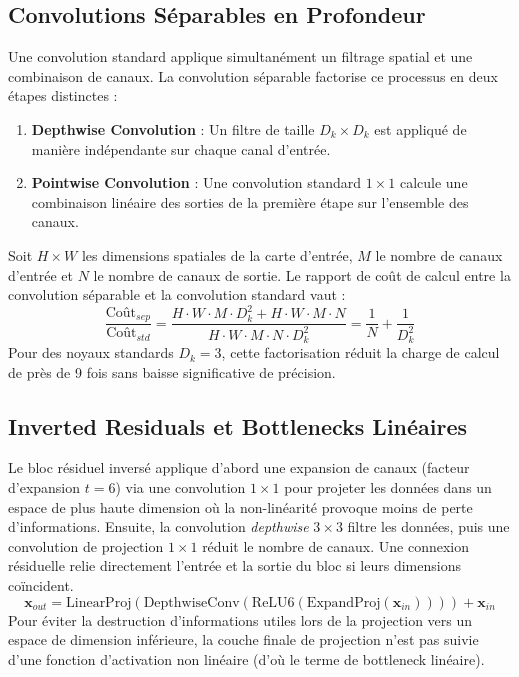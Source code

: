 \documentclass[12pt,a4paper]{article}
\begin{document}
\subsection{Convolutions Séparables en Profondeur}
Une convolution standard applique simultanément un filtrage spatial et une combinaison de canaux. La convolution séparable factorise ce processus en deux étapes distinctes :
\begin{enumerate}
    \item \textbf{Depthwise Convolution} : Un filtre de taille $D_k \times D_k$ est appliqué de manière indépendante sur chaque canal d'entrée.
    \item \textbf{Pointwise Convolution} : Une convolution standard $1 \times 1$ calcule une combinaison linéaire des sorties de la première étape sur l'ensemble des canaux.
\end{enumerate}
Soit $H \times W$ les dimensions spatiales de la carte d'entrée, $M$ le nombre de canaux d'entrée et $N$ le nombre de canaux de sortie. Le rapport de coût de calcul entre la convolution séparable et la convolution standard vaut :
\begin{equation}
    \frac{\text{Coût}_{sep}}{\text{Coût}_{std}} = \frac{H \cdot W \cdot M \cdot D_k^2 + H \cdot W \cdot M \cdot N}{H \cdot W \cdot M \cdot N \cdot D_k^2} = \frac{1}{N} + \frac{1}{D_k^2}
\end{equation}
Pour des noyaux standards $D_k = 3$, cette factorisation réduit la charge de calcul de près de 9 fois sans baisse significative de précision.

\subsection{Inverted Residuals et Bottlenecks Linéaires}
Le bloc résiduel inversé applique d'abord une expansion de canaux (facteur d'expansion $t=6$) via une convolution $1 \times 1$ pour projeter les données dans un espace de plus haute dimension où la non-linéarité provoque moins de perte d'informations. Ensuite, la convolution \emph{depthwise} $3 \times 3$ filtre les données, puis une convolution de projection $1 \times 1$ réduit le nombre de canaux. Une connexion résiduelle relie directement l'entrée et la sortie du bloc si leurs dimensions coïncident.
\begin{equation}
    \mathbf{x}_{out} = \text{LinearProj}(\text{DepthwiseConv}(\text{ReLU6}(\text{ExpandProj}(\mathbf{x}_{in})))) + \mathbf{x}_{in}
\end{equation}
Pour éviter la destruction d'informations utiles lors de la projection vers un espace de dimension inférieure, la couche finale de projection n'est pas suivie d'une fonction d'activation non linéaire (d'où le terme de bottleneck linéaire).
\end{document}
